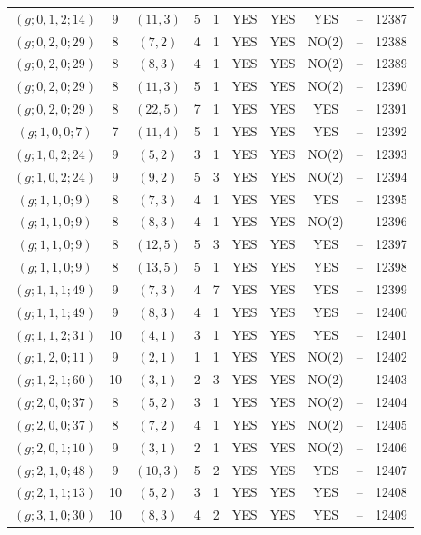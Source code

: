 \begin{longtable}{|c|c|c|c|c|c|c|c|c|c|}
$(g; 0, 1, 2; 14)$ & 9 & $(11, 3)$ & 5 & 1 & YES & YES & YES & -- & 12387\\
$(g; 0, 2, 0; 29)$ & 8 & $(7, 2)$ & 4 & 1 & YES & YES & NO(2) & -- & 12388\\
$(g; 0, 2, 0; 29)$ & 8 & $(8, 3)$ & 4 & 1 & YES & YES & NO(2) & -- & 12389\\
$(g; 0, 2, 0; 29)$ & 8 & $(11, 3)$ & 5 & 1 & YES & YES & NO(2) & -- & 12390\\
$(g; 0, 2, 0; 29)$ & 8 & $(22, 5)$ & 7 & 1 & YES & YES & YES & -- & 12391\\
$(g; 1, 0, 0; 7)$ & 7 & $(11, 4)$ & 5 & 1 & YES & YES & YES & -- & 12392\\
$(g; 1, 0, 2; 24)$ & 9 & $(5, 2)$ & 3 & 1 & YES & YES & NO(2) & -- & 12393\\
$(g; 1, 0, 2; 24)$ & 9 & $(9, 2)$ & 5 & 3 & YES & YES & NO(2) & -- & 12394\\
$(g; 1, 1, 0; 9)$ & 8 & $(7, 3)$ & 4 & 1 & YES & YES & YES & -- & 12395\\
$(g; 1, 1, 0; 9)$ & 8 & $(8, 3)$ & 4 & 1 & YES & YES & NO(2) & -- & 12396\\
$(g; 1, 1, 0; 9)$ & 8 & $(12, 5)$ & 5 & 3 & YES & YES & YES & -- & 12397\\
$(g; 1, 1, 0; 9)$ & 8 & $(13, 5)$ & 5 & 1 & YES & YES & YES & -- & 12398\\
$(g; 1, 1, 1; 49)$ & 9 & $(7, 3)$ & 4 & 7 & YES & YES & YES & -- & 12399\\
$(g; 1, 1, 1; 49)$ & 9 & $(8, 3)$ & 4 & 1 & YES & YES & YES & -- & 12400\\
$(g; 1, 1, 2; 31)$ & 10 & $(4, 1)$ & 3 & 1 & YES & YES & YES & -- & 12401\\
$(g; 1, 2, 0; 11)$ & 9 & $(2, 1)$ & 1 & 1 & YES & YES & NO(2) & -- & 12402\\
$(g; 1, 2, 1; 60)$ & 10 & $(3, 1)$ & 2 & 3 & YES & YES & NO(2) & -- & 12403\\
$(g; 2, 0, 0; 37)$ & 8 & $(5, 2)$ & 3 & 1 & YES & YES & NO(2) & -- & 12404\\
$(g; 2, 0, 0; 37)$ & 8 & $(7, 2)$ & 4 & 1 & YES & YES & NO(2) & -- & 12405\\
$(g; 2, 0, 1; 10)$ & 9 & $(3, 1)$ & 2 & 1 & YES & YES & NO(2) & -- & 12406\\
$(g; 2, 1, 0; 48)$ & 9 & $(10, 3)$ & 5 & 2 & YES & YES & YES & -- & 12407\\
$(g; 2, 1, 1; 13)$ & 10 & $(5, 2)$ & 3 & 1 & YES & YES & YES & -- & 12408\\
$(g; 3, 1, 0; 30)$ & 10 & $(8, 3)$ & 4 & 2 & YES & YES & YES & -- & 12409\\

\end{longtable}
